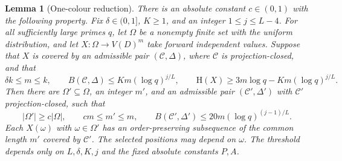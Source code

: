 \documentclass[11pt,a4paper]{article}
\numberwithin{equation}{section}
\newtheorem{lemma}[theorem]{Lemma}
\newcommand{\HH}{\mathrm H}
\newcommand{\cC}{\mathcal C}
\begin{document}
\begin{lemma}[One-colour reduction]\label{lem:reduction}
There is an absolute constant $c\in(0,1)$ with the following
property. Fix $\delta\in(0,1]$, $K\ge1$, and an integer
$1\le j\le L-4$.
For all sufficiently large primes $q$, let $\Omega$ be a
nonempty finite set with the uniform distribution, and let
$X:\Omega\to V(D)^m$ take forward independent values.
Suppose that $X$ is covered by an admissible pair $(\cC,\Delta)$,
where $\cC$ is projection-closed, and that
\begin{equation}\label{eq:reduction-input}
 \delta k\le m\le k,\qquad
 B(\cC,\Delta)\le Km(\log q)^{j/L},\qquad
 \HH(X)\ge3m\log q-Km(\log q)^{j/L}.
\end{equation}
Then there are $\Omega'\subseteq\Omega$, an integer $m'$, and
an admissible pair $(\cC',\Delta')$ with $\cC'$ projection-closed,
such that
\begin{equation}\label{eq:reduction-output}
 |\Omega'|\ge c|\Omega|,\qquad
 cm\le m'\le m,\qquad
 B(\cC',\Delta')\le20m(\log q)^{(j-1)/L}.
\end{equation}
Each $X(\omega)$ with $\omega\in\Omega'$ has an order-preserving
subsequence of the common length $m'$ covered by $\cC'$.
The selected positions may depend on $\omega$.
The threshold depends only on $L,\delta,K,j$ and the fixed
absolute constants $P,A$.
\end{lemma}
\end{document}
